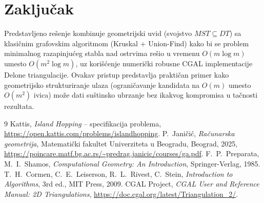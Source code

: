 \documentclass[11pt]{article}
\theoremstyle{definition}
\begin{document}
\section{Zaključak}

Predstavljeno rešenje kombinuje geometrijski uvid (svojstvo $MST \subseteq DT$) sa klasičnim grafovskim algoritmom (Kruskal + Union-Find) kako bi se problem minimalnog razapinjućeg stabla nad ostrvima rešio u vremenu $O(m \log m)$ umesto $O(m^2 \log m)$, uz korišćenje numerički robusne CGAL implementacije Delone triangulacije. Ovakav pristup predstavlja praktičan primer kako geometrijsko strukturiranje ulaza (ograničavanje kandidata na $O(m)$ umesto $O(m^2)$ ivica) može dati suštinsko ubrzanje bez ikakvog kompromisa u tačnosti rezultata.

\begin{thebibliography}{9}
 Kattis, \emph{Island Hopping} -- specifikacija problema, \url{https://open.kattis.com/problems/islandhopping}.
P.~Janičić,
\emph{Računarska geometrija},
Matematički fakultet Univerziteta u Beogradu, Beograd, 2025,
\url{https://poincare.matf.bg.ac.rs/~predrag.janicic/courses/ga.pdf}.
 F.~P.~Preparata, M.~I.~Shamos, \emph{Computational Geometry: An Introduction}, Springer-Verlag, 1985.
 T.~H.~Cormen, C.~E.~Leiserson, R.~L.~Rivest, C.~Stein, \emph{Introduction to Algorithms}, 3rd ed., MIT Press, 2009.
 CGAL Project, \emph{CGAL User and Reference Manual: 2D Triangulations}, \url{https://doc.cgal.org/latest/Triangulation_2/}.
\end{thebibliography}
\end{document}
